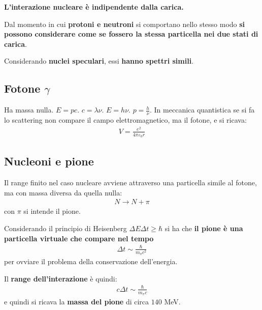 \documentclass[a4paper,11pt,twoside,openany]{book}
\theoremstyle{definition}
\theoremstyle{plain}
\theoremstyle{plain}
\theoremstyle{definition}
\begin{document}
\textbf{L'interazione nucleare è indipendente dalla carica.}

Dal momento in cui \textbf{protoni e neutroni} si comportano nello stesso modo \textbf{si possono considerare come se fossero la stessa particella nei due stati di carica}.

Considerando \textbf{nuclei speculari}, essi \textbf{hanno spettri simili}.

\subsection{Fotone $\gamma$} %
Ha massa nulla. $E=pc$. $c=\lambda\nu$. $E=h\nu$. $p=\frac{h}{\nu}$. In meccanica quantistica se si fa lo scattering non compare il campo elettromagnetico, ma il fotone, e si ricava:
\begin{equation}\begin{split}
V=\frac{e^2}{4\pi\varepsilon_0r}
\end{split}\end{equation}

\subsection{Nucleoni e pione} %
Il range finito nel caso nucleare avviene attraverso una particella simile al fotone, ma con massa diversa da quella nulla:
\begin{equation}\begin{split}
N\rightarrow N+\pi
\end{split}\end{equation}
con $\pi$ si intende il pione.

Considerando il principio di Heisenberg $\Delta E\Delta t\ge \hbar $ si ha che \textbf{il pione è una particella virtuale che compare nel tempo}
\begin{equation}\begin{split}
\Delta t\sim \frac{\hbar }{m_\pi c^2}
\end{split}\end{equation}
per ovviare il problema della conservazione dell'energia.

Il \textbf{range dell'interazione} è quindi:
\begin{equation}\begin{split}
c\Delta t \sim \frac{\hbar }{m_\pi c}
\end{split}\end{equation}
e quindi si ricava la \textbf{massa del pione} di circa $140$ MeV.
\end{document}

